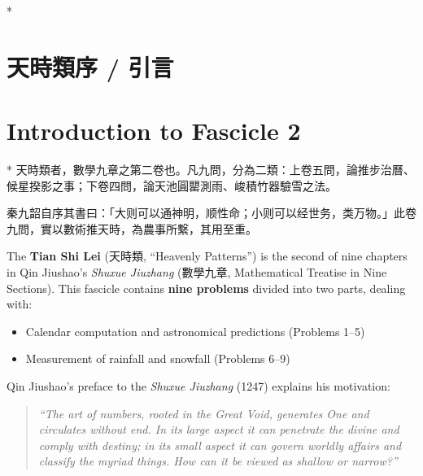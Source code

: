 \documentclass[11pt,a4paper]{article}
\begin{document}
\tableofcontents
\newpage

\switchcolumn[0]*
\section*{天時類序 / 引言}

\switchcolumn[1]
\section*{Introduction to Fascicle 2}

\switchcolumn[0]*
天時類者，數學九章之第二卷也。凡九問，分為二類：上卷五問，論推步治曆、候星揆影之事；下卷四問，論天池圓罌測雨、峻積竹器驗雪之法。

秦九韶自序其書曰：「大则可以通神明，顺性命；小则可以经世务，类万物。」此卷九問，實以數術推天時，為農事所繫，其用至重。

\switchcolumn[1]
The \textbf{Tian Shi Lei} (天時類, ``Heavenly Patterns'') is the second of nine chapters in Qin Jiushao's \textit{Shuxue Jiuzhang} (數學九章, Mathematical Treatise in Nine Sections). This fascicle contains \textbf{nine problems} divided into two parts, dealing with:

\begin{itemize}[noitemsep,topsep=0pt]
  \item Calendar computation and astronomical predictions (Problems 1--5)
  \item Measurement of rainfall and snowfall (Problems 6--9)
\end{itemize}

Qin Jiushao's preface to the \textit{Shuxue Jiuzhang} (1247) explains his motivation:

\begin{quote}
\textit{``The art of numbers, rooted in the Great Void, generates One and circulates without end. In its large aspect it can penetrate the divine and comply with destiny; in its small aspect it can govern worldly affairs and classify the myriad things. How can it be viewed as shallow or narrow?''}
\end{quote}
\end{document}
